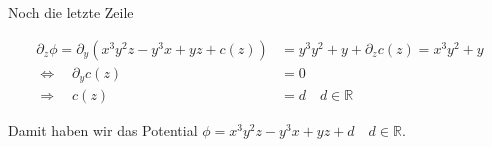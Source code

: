 Noch die letzte Zeile

\begin{align*}
\partial_z\phi= \partial_y\left( x^3y^2z-y^3x+yz+c(z)\right)&=y^3y^2+y+\partial_z c(z)=x^3y^2+y\\
\Leftrightarrow \quad \partial_y c(z)&=0\\
\Rightarrow \quad c(z)&=d \quad d\in\mathbb{R}
\end{align*}

Damit haben wir das Potential $\phi=x^3y^2z-y^3x+yz+d \quad d\in\mathbb{R}$.
